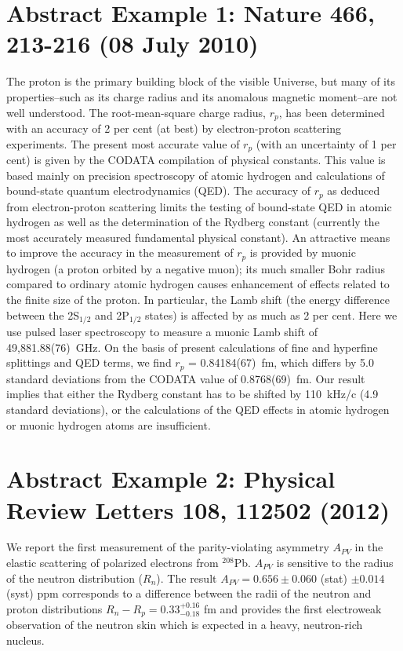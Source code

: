 \documentclass{article}
\begin{document}
\section{Abstract Example 1: Nature 466, 213-216 (08 July 2010)}

The proton is the primary building block of the visible Universe, but many
of its properties--such as its charge radius and its anomalous magnetic 
moment--are not well understood. The root-mean-square charge radius, $r_p$,
has been determined with an accuracy of 2 per cent (at best) by electron-proton
scattering experiments. The present most accurate value of $r_p$ (with an
uncertainty of 1 per cent) is given by the CODATA compilation of physical
constants. This value is based mainly on precision spectroscopy of atomic
hydrogen and calculations of bound-state quantum electrodynamics (QED).
The accuracy of $r_p$ as deduced from electron-proton scattering limits
the testing of bound-state QED in atomic hydrogen as well as the
determination of the Rydberg constant (currently the most accurately measured
fundamental physical constant). An attractive means to improve the accuracy
in the measurement of $r_p$ is provided by muonic hydrogen (a proton
orbited by a negative muon); its much smaller Bohr radius compared to
ordinary atomic hydrogen causes enhancement of effects related to the
finite size of the proton. In particular, the Lamb shift (the energy
difference between the 2S$_{1/2}$ and 2P$_{1/2}$ states) is affected by as
much as 2 per cent. Here we use pulsed laser spectroscopy to measure a muonic
Lamb shift of 49,881.88(76)~GHz. On the basis of present calculations of
fine and hyperfine splittings and QED terms, we find $r_p$ = 0.84184(67)~fm,
which differs by 5.0 standard deviations from the CODATA value of 
0.8768(69)~fm. Our result implies that either the Rydberg constant has to
be shifted by 110~kHz/c (4.9 standard deviations), or the calculations of
the QED effects in atomic hydrogen or muonic hydrogen atoms are insufficient.

\section{Abstract Example 2: Physical Review Letters 108, 112502 (2012)}

We report the first measurement of the parity-violating asymmetry $A_{PV}$
in the elastic scattering of polarized electrons from $^{208}$Pb. $A_{PV}$
is sensitive to the radius of the neutron distribution ($R_n$). The result
$A_{PV} = 0.656 \pm 0.060$ (stat) $\pm 0.014 $(syst) ppm corresponds to a 
difference between the radii of the neutron and proton distributions 
$R_n - R_p = 0.33^{+0.16}_{-0.18}$ fm and provides the first electroweak
observation of the neutron skin which is expected in a heavy, neutron-rich nucleus.
\end{document}
